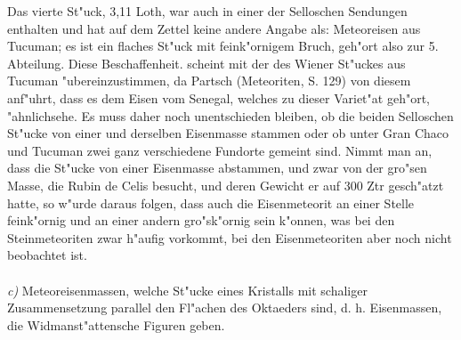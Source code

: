 \documentclass[a4paper, 11pt, oneside, german]{article}
\begin{document}
Das vierte St"uck, 3,11 Loth, war auch in einer der Selloschen Sendungen enthalten und hat auf dem Zettel keine andere Angabe als: Meteoreisen aus Tucuman; es ist ein flaches St"uck mit feink"ornigem Bruch, geh"ort also zur 5. Abteilung. Diese Beschaffenheit. scheint mit der des Wiener St"uckes aus Tucuman "ubereinzustimmen, da Partsch (Meteoriten, S. 129) von diesem anf"uhrt, dass es dem Eisen vom Senegal, welches zu dieser Variet"at geh"ort, "ahnlichsehe. Es muss daher noch unentschieden bleiben, ob die beiden Selloschen St"ucke von einer und derselben Eisenmasse stammen oder ob unter Gran Chaco und Tucuman zwei ganz verschiedene Fundorte gemeint sind. Nimmt man an, dass die St"ucke von einer Eisenmasse abstammen, und zwar von der gro"sen Masse, die Rubin de Celis besucht, und deren Gewicht er auf 300 Ztr gesch"atzt hatte, so w"urde daraus folgen, dass auch die Eisenmeteorit an einer Stelle feink"ornig und an einer andern gro"sk"ornig sein k"onnen, was bei den Steinmeteoriten zwar h"aufig vorkommt, bei den Eisenmeteoriten aber noch nicht beobachtet ist.
\vspace{\medskipamount}
\paragraph{}
\emph{c)} Meteoreisenmassen, welche St"ucke eines Kristalls mit schaliger Zusammensetzung parallel den Fl"achen des Oktaeders sind, d. h. Eisenmassen, die Widmanst"attensche Figuren geben.
\vspace{\medskipamount}
\end{document}
